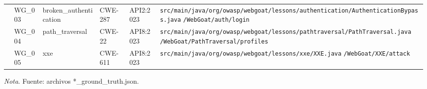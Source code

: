 \begin{table}[htbp]
\begin{tabular}{|p{1.7cm}|p{1.4cm}|p{2.6cm}|p{1.3cm}|p{1.5cm}|p{4.6cm}|}
 & WG\_003 & broken\_\allowbreak{}authentication & CWE-287 & API2:2023 & \texttt{src/\allowbreak{}main/\allowbreak{}java/\allowbreak{}org/\allowbreak{}owasp/\allowbreak{}webgoat/\allowbreak{}lessons/\allowbreak{}authentication/\allowbreak{}AuthenticationBypass.java} \newline \texttt{/\allowbreak{}WebGoat/\allowbreak{}auth/\allowbreak{}login} \\
 & WG\_004 & path\_\allowbreak{}traversal & CWE-22 & API8:2023 & \texttt{src/\allowbreak{}main/\allowbreak{}java/\allowbreak{}org/\allowbreak{}owasp/\allowbreak{}webgoat/\allowbreak{}lessons/\allowbreak{}pathtraversal/\allowbreak{}PathTraversal.java} \newline \texttt{/\allowbreak{}WebGoat/\allowbreak{}PathTraversal/\allowbreak{}profiles} \\
 & WG\_005 & xxe & CWE-611 & API8:2023 & \texttt{src/\allowbreak{}main/\allowbreak{}java/\allowbreak{}org/\allowbreak{}owasp/\allowbreak{}webgoat/\allowbreak{}lessons/\allowbreak{}xxe/\allowbreak{}XXE.java} \newline \texttt{/\allowbreak{}WebGoat/\allowbreak{}XXE/\allowbreak{}attack} \\
\hline
\end{tabular}
\end{table}
\begin{flushleft}\textit{Nota}. Fuente: archivos *\_ground\_truth.json.\end{flushleft}
